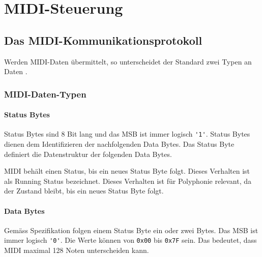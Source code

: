 
\chapter{MIDI-Steuerung}\label{chap.midi}

\section{Das MIDI-Kommunikationsprotokoll}\label{sect.midi_spezification}

Werden MIDI-Daten übermittelt, so unterscheidet der Standard zwei Typen an Daten \citep{Midi_specification}.

\subsection{MIDI-Daten-Typen}\label{datentypen}

\subsubsection*{Status Bytes}

Status Bytes sind 8 Bit lang und das MSB ist immer logisch \lstinline|'1'|. Status Bytes dienen dem Identifizieren der nachfolgenden Data Bytes. Das Status Byte definiert die Datenstruktur der folgenden Data Bytes.

MIDI behält einen Status, bis ein neues Status Byte folgt. Dieses Verhalten ist als Running Status bezeichnet. Dieses Verhalten ist für Polyphonie relevant, da der Zustand bleibt, bis ein neues Status Byte folgt.

\subsubsection*{Data Bytes}

Gemäss Spezifikation folgen einem Status Byte ein oder zwei Bytes. Das MSB ist immer logisch \lstinline|'0'|. Die Werte können von \lstinline|0x00| bis \lstinline|0x7F| sein. Das bedeutet, dass MIDI maximal 128 Noten unterscheiden kann.

